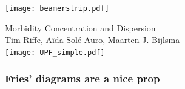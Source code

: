 \documentclass[20pt]{beamer}
\begin{document}


\begin{frame}[plain]
	\vspace{-4.4cm}
 \centerline{\texttt{[image: beamerstrip.pdf]}}

	
	\huge
	\vspace{1em}
	
	Morbidity Concentration and Dispersion \\
	\vspace{1em}
	\large 
	Tim Riffe, A{\"i}da Sol\'{e} Auro, Maarten J. Bijlsma\\
	
	\vspace{2em}
	\hspace{18cm}\texttt{[image: UPF\_simple.pdf]}
\end{frame}

\begin{frame}
\frametitle{Fries' diagrams are a nice prop}
\begin{center}
\end{center}
\end{frame}


%

\end{document}
